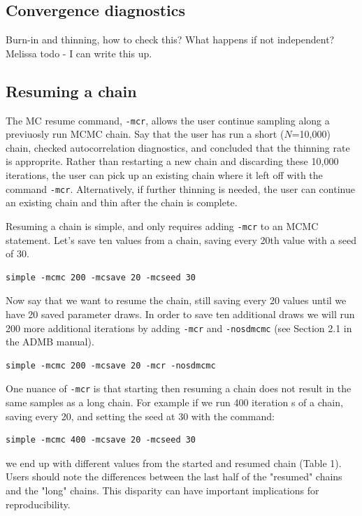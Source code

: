 \documentclass{article}\usepackage[]{graphicx}\usepackage[]{color}
\begin{document}
\subsection{Convergence diagnostics} \label{sec:diag}
Burn-in and thinning, how to check this? What happens if not
independent? Melissa todo - I can write this up. 

\subsection{Resuming a chain}\label{sec:restart}
The MC resume command, \texttt{-mcr}, allows the user continue sampling along 
a previuosly run MCMC chain. Say that the user has run a short ($N$=10,000) chain, 
checked autocorrelation diagnostics, and concluded that the thinning rate is
approprite. Rather than restarting a new chain and discarding these 10,000 
iterations, the user can pick up an existing chain where it left off with the 
command \texttt{-mcr}. Alternatively, if further thinning is needed, the user
can continue an existing chain and thin after the chain is complete. 

Resuming a chain is simple, and only requires adding \texttt{-mcr} to an MCMC 
statement. Let's save ten values from a chain, saving every 20th value with 
a seed of 30.

\begin{verbatim}
simple -mcmc 200 -mcsave 20 -mcseed 30
\end{verbatim}

Now say that we want to resume the chain, still saving every 20 values until we 
have 20 saved parameter draws. In order to save ten additional draws we will 
run 200 more additional iterations by adding \texttt{-mcr} and 
\texttt{-nosdmcmc} (see Section 2.1 in the ADMB manual). 

\begin{verbatim}
simple -mcmc 200 -mcsave 20 -mcr -nosdmcmc
\end{verbatim}

One nuance of \texttt{-mcr} is that starting then resuming a chain does not
result in the same samples as a long chain. For example if we run 400 iteration
s of a chain, saving every 20, and setting the seed at 30 with the command:

\begin{verbatim}
simple -mcmc 400 -mcsave 20 -mcseed 30
\end{verbatim}

we end up with different values from the started and resumed chain (Table 1). 
Users should note the differences between the last half of the "resumed" chains 
and the "long" chains. This disparity can have important implications for
reproducibility.
\end{document}
